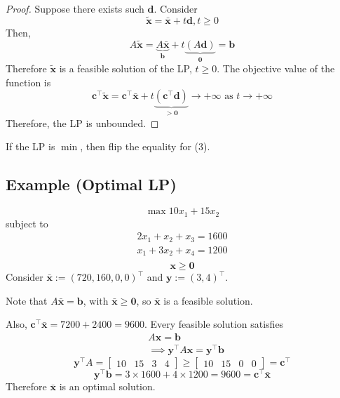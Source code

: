\begin{proof}
    Suppose there exists such $\bm{d}$. Consider
    \[\tilde{\bm{x}}=\bar{\bm{x}}+t\bm{d}, t\ge 0\]
Then,
\[A\tilde{\bm{x}}=
\underbrace{A\bar{\bm{x}}}_{\bm{b}}+
t\underbrace{(A\bm{d})}_{\bm{0}}=\bm{b}\]
Therefore $\tilde{\bm{x}}$ is a feasible solution of the LP, $t\ge 0$.
The objective value of the function is
\[\bm{c}^\top \tilde{\bm{x}}=\bm{c}^\top \bar{\bm{x}}+t
\underbrace{(\bm{c}^\top \bm{d})}_{>\bm{0}}\rightarrow +\infty\text{ as }t\rightarrow+\infty\]
Therefore, the LP is unbounded.
\end{proof}
\begin{remark}
    If the LP is $\min$, then flip the equality for (3).
\end{remark}

\subsection{Example (Optimal LP)}
\[\max 10x_1+15x_2\]
subject to
\begin{align*}
    2x_1+x_2+x_3=1600\\
    x_1+3x_2+x_4=1200\\
\end{align*}
\[ \bm{x}\ge \bm{0} \]
Consider $\bar{\bm{x}}:=(720,160,0,0)^\top$ and $\bm{y}:=(3,4)^\top$.

Note that
$A\bar{\bm{x}}=\bm{b}$, with $\bar{\bm{x}}\ge \bm{0}$, 
so $\bar{\bm{x}}$ is a feasible solution.


Also, $\bm{c}^\top \bm{\bar{x}}=7200+2400=9600$.
Every feasible solution satisfies
\begin{align*}
    &A\bm{x}=\bm{b}\\
    &\implies \bm{y}^\top A\bm{x}=\bm{y}^\top \bm{b}
\end{align*}
\[\bm{y}^\top A=
\begin{bmatrix}
    10 & 15 & 3 & 4
\end{bmatrix}
\ge
\begin{bmatrix}
    10 & 15 & 0 & 0
\end{bmatrix}=\bm{c}^\top \]
\[\bm{y}^\top \bm{b}
=3\times 1600+4\times 1200=9600
=\bm{c}^\top \bm{\bar{x}}\]
Therefore $\bar{\bm{x}}$ is an optimal solution.
